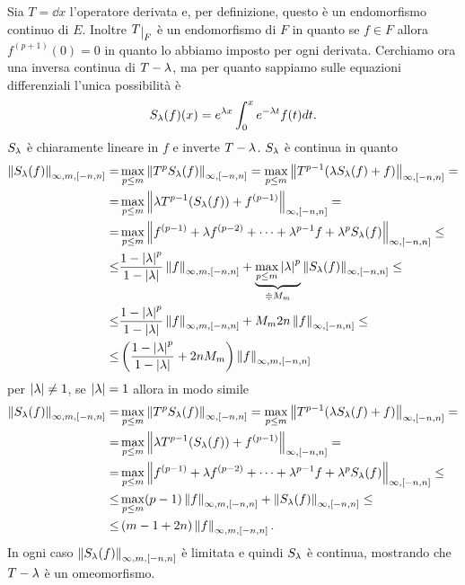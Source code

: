 \documentclass[a4paper]{article}
\begin{document}
\begin{solution}
\begin{itemize}
Sia $T=\dd x{}$ l'operatore derivata e, per definizione, questo \`e un endomorfismo continuo di $E$. Inoltre $T\res F$ \`e un endomorfismo di $F$ in quanto se $f\in F$ allora $f^{(p+1)}(0)=0$ in quanto lo abbiamo imposto per ogni derivata. Cerchiamo ora una inversa continua di $T-\lambda$, ma per quanto sappiamo sulle equazioni differenziali l'unica possibilit\`a \`e
\[S_\lambda(f)(x)=e^{\lambda x}\int_0^x e^{-\lambda t}f(t)dt.\]
$S_\lambda$ \`e chiaramente lineare in $f$ e inverte $T-\lambda$. $S_\lambda$ \`e continua in quanto
\begin{align*}
\left\Vert{S_\lambda(f)}\right\Vert_{\infty,m,[-n,n]}=&\max_{p\leq m}\left\Vert{T^pS_\lambda(f)}\right\Vert_{\infty,[-n,n]}=\max_{p\leq m}\left\Vert{T^{p-1}(\lambda S_\lambda(f)+f)}\right\Vert_{\infty,[-n,n]}=\\
=&\max_{p\leq m}\left\Vert{\lambda T^{p-1}(S_\lambda(f))+f^{(p-1)}}\right\Vert_{\infty,[-n,n]}=\\
=&\max_{p\leq m}\left\Vert{f^{(p-1)}+\lambda f^{(p-2)}+\cdots+\lambda^{p-1}f+\lambda^p S_\lambda(f)}\right\Vert_{\infty,[-n,n]}\leq\\
\leq&\frac{1-\left|{\lambda}\right|^p}{1-\left|{\lambda}\right|}\left\Vert{f}\right\Vert_{\infty,m,[-n,n]} +\underset{\doteqdot M_m}{\underbrace{\max_{p\leq m}\left|{\lambda}\right|^p}}\left\Vert{S_\lambda(f)}\right\Vert_{\infty,[-n,n]}\leq\\
\leq&\frac{1-\left|{\lambda}\right|^p}{1-\left|{\lambda}\right|}\left\Vert{f}\right\Vert_{\infty,m,[-n,n]} +M_m2n\left\Vert{f}\right\Vert_{\infty,[-n,n]}\leq\\
\leq&\left({\frac{1-\left|{\lambda}\right|^p}{1-\left|{\lambda}\right|}+2nM_m}\right)\left\Vert{f}\right\Vert_{\infty,m,[-n,n]}
\end{align*}
per $\left|{\lambda}\right|\neq 1$, se $\left|{\lambda}\right|=1$ allora in modo simile
\begin{align*}
\left\Vert{S_\lambda(f)}\right\Vert_{\infty,m,[-n,n]}=&\max_{p\leq m}\left\Vert{T^pS_\lambda(f)}\right\Vert_{\infty,[-n,n]}=\max_{p\leq m}\left\Vert{T^{p-1}(\lambda S_\lambda(f)+f)}\right\Vert_{\infty,[-n,n]}=\\
=&\max_{p\leq m}\left\Vert{\lambda T^{p-1}(S_\lambda(f))+f^{(p-1)}}\right\Vert_{\infty,[-n,n]}=\\
=&\max_{p\leq m}\left\Vert{f^{(p-1)}+\lambda f^{(p-2)}+\cdots+\lambda^{p-1}f+\lambda^p S_\lambda(f)}\right\Vert_{\infty,[-n,n]}\leq\\
\leq&\max_{p\leq m}(p-1)\left\Vert{f}\right\Vert_{\infty,m,[-n,n]} +\left\Vert{S_\lambda(f)}\right\Vert_{\infty,[-n,n]}\leq\\
\leq&\left({m-1+2n}\right)\left\Vert{f}\right\Vert_{\infty,m,[-n,n]}.
\end{align*}
In ogni caso $\left\Vert{S_\lambda(f)}\right\Vert_{\infty,m,[-n,n]}$ \`e limitata e quindi $S_\lambda$ \`e continua, mostrando che $T-\lambda$ \`e un omeomorfismo.


\end{itemize}
\end{solution}
\end{document}
